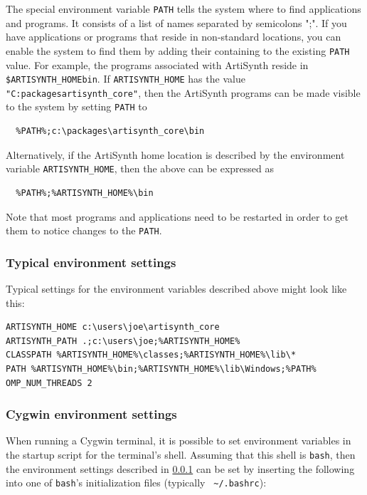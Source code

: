 The special environment variable {\tt PATH} tells the system where to find
applications and programs. It consists of a list of \directory names
separated by semicolons ";". If you have applications or programs that
reside in non-standard locations, you can enable the system to find
them by adding their containing \directory to the existing {\tt PATH}
value. For example, the programs associated with ArtiSynth reside in
{\tt \$ARTISYNTH\_HOME\SEP bin}. If {\tt ARTISYNTH\_HOME} has the value
{\tt "C:\SEP packages\SEP artisynth\_core"}, then the ArtiSynth programs
can be made visible to the system by setting {\tt PATH} to

\begin{verbatim}
  %PATH%;c:\packages\artisynth_core\bin
\end{verbatim}

Alternatively, if the ArtiSynth home location is described by
the environment variable {\tt ARTISYNTH\_HOME}, then the
above can be expressed as

\begin{verbatim}
  %PATH%;%ARTISYNTH_HOME%\bin
\end{verbatim}

Note that most programs and applications need to be restarted in order
to get them to notice changes to the {\tt PATH}.

\subsubsection{Typical environment settings}
\label{TypicalEnvironment}

Typical settings for the environment variables described above might
look like this:

\begin{lstlisting}
ARTISYNTH_HOME c:\users\joe\artisynth_core
ARTISYNTH_PATH .;c:\users\joe;%ARTISYNTH_HOME%
CLASSPATH %ARTISYNTH_HOME%\classes;%ARTISYNTH_HOME%\lib\*
PATH %ARTISYNTH_HOME%\bin;%ARTISYNTH_HOME%\lib\Windows;%PATH%
OMP_NUM_THREADS 2
\end{lstlisting}

\subsubsection{Cygwin environment settings}
\label{CygwinEnvironmentSettings}

When running a Cygwin terminal, it is possible to set environment
variables in the startup script for the terminal's shell. Assuming
that this shell is {\tt bash}, then the environment settings described
in \ref{TypicalEnvironment} can be set by inserting the following
into one of {\tt bash}'s initialization files (typically {\tt
\textasciitilde/.bashrc}):

